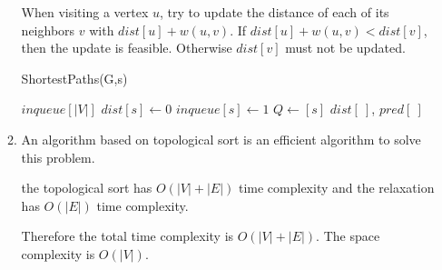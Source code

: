 \documentclass[12pt,a4paper]{article}
\theoremstyle{definition}
\begin{document}
\begin{enumerate}
\begin{enumerate}
        	    When visiting a vertex $u$, try to update the distance of each of its neighbors $v$ with $dist[u]+w(u,v)$. If $dist[u]+w(u,v)<dist[v]$, then the update is feasible. Otherwise $dist[v]$ must not be updated.
        	    
        	    \begin{minipage}[t]{0.85\textwidth}
        	    	\begin{algorithm}[H]
        	    		\BlankLine
        	    		\caption{ShortestPaths(G,s)}
        	    		\label{Alg-spdag}
        	    		$inqueue[|V|]$\;
            	    	$dist[s] \leftarrow 0$\;
            	    	$inqueue[s]\leftarrow 1$\;
            	    	$Q \leftarrow [s]$\;
        	    		\Return $dist[\ ]$, $pred[\ ]$\;
        	    	\end{algorithm}
        	    \end{minipage}
        	\item 
        	    An algorithm based on topological sort is an efficient algorithm to solve this problem.
        	    
        	    the topological sort has $O(|V|+|E|)$ time complexity and the relaxation has $O(|E|)$ time complexity. 
        	    
        	    Therefore the total time complexity is $O(|V|+|E|)$. The space complexity is $O(|V|)$.
        	    

\end{enumerate}
\end{enumerate}
\end{document}
